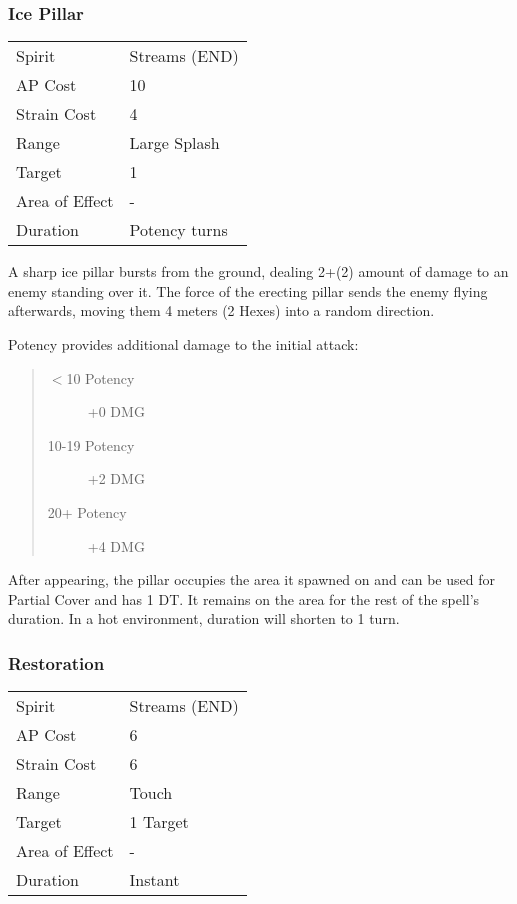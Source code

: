 \documentclass[11pt,a4paper,twocolumn]{book}
\begin{document}
\medskip

\subsubsection*{Ice Pillar}
{
	\begin{tabu} to 70mm{| X[l,4] | X[l,7] |}
		\hline
		Spirit         & Streams (END)       \\
		AP Cost        & 10                   \\
		Strain Cost    & 4                    \\
		Range          & Large Splash         \\
		Target         & 1                    \\
		Area of Effect & -                    \\
		Duration       & Potency turns \\ \hline
	\end{tabu}
	
}
\medskip

A sharp ice pillar bursts from the ground, dealing 2+(2) amount of damage to an enemy standing over it. The force of the erecting pillar sends the enemy flying afterwards, moving them 4 meters (2 Hexes) into a random direction.

Potency provides additional damage to the initial attack:
\begin{quote}
	\begin{description}
		\item[$<$10 Potency] 	+0 DMG
		\item[10-19 Potency] 	+2 DMG
		\item[20+ Potency]  	+4 DMG
	\end{description}	
\end{quote}

After appearing, the pillar occupies the area it spawned on and can be used for Partial Cover and has 1 DT. It remains on the area for the rest of the spell's duration. In a hot environment, duration will shorten to 1 turn.

\subsubsection*{Restoration}
{
	\begin{tabu} to 75mm{| X[l,4] | X[l,7] |}
		\hline
		Spirit 			& Streams (END) 		\\
		AP Cost	      	& 6 					\\
		Strain Cost     & 6 					\\
		Range     		& Touch					\\
		Target      	& 1 Target				\\
		Area of Effect  & -  	 				\\
		Duration     	& Instant				\\ \hline
	\end{tabu}
	
}
\end{document}
